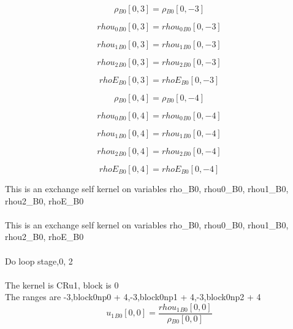 \documentclass{article}
\begin{document}
\begin{dmath}{\rho{_{B0}}}[{0,3}] = {\rho{_{B0}}}[{0,-3}]\end{dmath}

\begin{dmath}{rhou_{0}{_{B0}}}[{0,3}] = {rhou_{0}{_{B0}}}[{0,-3}]\end{dmath}

\begin{dmath}{rhou_{1}{_{B0}}}[{0,3}] = {rhou_{1}{_{B0}}}[{0,-3}]\end{dmath}

\begin{dmath}{rhou_{2}{_{B0}}}[{0,3}] = {rhou_{2}{_{B0}}}[{0,-3}]\end{dmath}

\begin{dmath}{rhoE{_{B0}}}[{0,3}] = {rhoE{_{B0}}}[{0,-3}]\end{dmath}

\begin{dmath}{\rho{_{B0}}}[{0,4}] = {\rho{_{B0}}}[{0,-4}]\end{dmath}

\begin{dmath}{rhou_{0}{_{B0}}}[{0,4}] = {rhou_{0}{_{B0}}}[{0,-4}]\end{dmath}

\begin{dmath}{rhou_{1}{_{B0}}}[{0,4}] = {rhou_{1}{_{B0}}}[{0,-4}]\end{dmath}

\begin{dmath}{rhou_{2}{_{B0}}}[{0,4}] = {rhou_{2}{_{B0}}}[{0,-4}]\end{dmath}

\begin{dmath}{rhoE{_{B0}}}[{0,4}] = {rhoE{_{B0}}}[{0,-4}]\end{dmath}

\noindent This is an exchange self kernel on variables rho_B0, rhou0_B0, rhou1_B0, rhou2_B0, rhoE_B0\\\\\noindent This is an exchange self kernel on variables rho_B0, rhou0_B0, rhou1_B0, rhou2_B0, rhoE_B0\\\\\noindent Do loop stage,0, 2\\
\\\noindent The kernel is CRu1, block is 0\\\noindent The ranges are -3,block0np0 + 4,-3,block0np1 + 4,-3,block0np2 + 4\\\begin{dmath}{u_{1}{_{B0}}}[{0,0}] = \frac{{rhou_{1}{_{B0}}}[{0,0}]}{{\rho{_{B0}}}[{0,0}]}\end{dmath}
\end{document}
